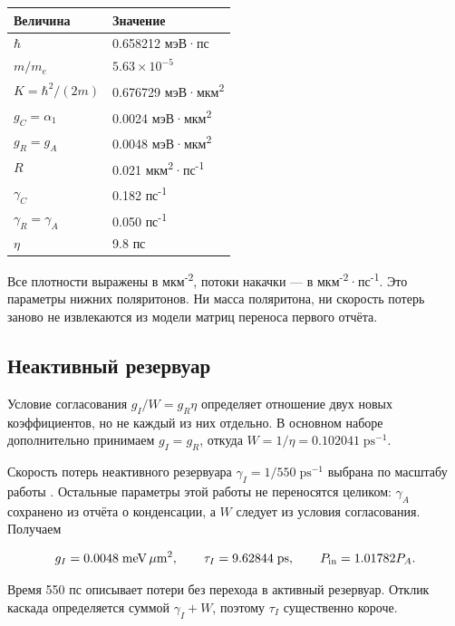 \documentclass[12pt,a4paper]{article}
\begin{document}
\begingroup\small\setlength{\tabcolsep}{5pt}\renewcommand{\arraystretch}{1.2}
\begin{longtable}{@{}p{}p{}@{}}
\toprule
Величина & Значение\\
\midrule
\(\hbar\) & 0.658212 мэВ·пс\\
\(m/m_e\) & \(5.63\times10^{-5}\)\\
\(K=\hbar^2/(2m)\) & 0.676729 мэВ·мкм\textsuperscript{2}\\
\(g_C=\alpha_1\) & 0.0024 мэВ·мкм\textsuperscript{2}\\
\(g_R=g_A\) & 0.0048 мэВ·мкм\textsuperscript{2}\\
\(R\) & 0.021 мкм\textsuperscript{2}·пс\textsuperscript{-}\textsuperscript{1}\\
\(\gamma_C\) & 0.182 пс\textsuperscript{-}\textsuperscript{1}\\
\(\gamma_R=\gamma_A\) & 0.050 пс\textsuperscript{-}\textsuperscript{1}\\
\(\eta\) & 9.8 пс\\
\bottomrule
\end{longtable}
\endgroup

Все плотности выражены в мкм\textsuperscript{-}\textsuperscript{2}, потоки накачки --- в мкм\textsuperscript{-}\textsuperscript{2}·пс\textsuperscript{-}\textsuperscript{1}. Это параметры нижних поляритонов. Ни масса поляритона, ни скорость потерь заново не извлекаются из модели матриц переноса первого отчёта.

\subsection{Неактивный резервуар}

Условие согласования \(g_I/W=g_R\eta\) определяет отношение двух новых коэффициентов, но не каждый из них отдельно. В основном наборе дополнительно принимаем \(g_I=g_R\), откуда \(W=1/\eta=0.102041\;\mathrm{ps}^{-1}\).

Скорость потерь неактивного резервуара \(\gamma_I=1/550\;\mathrm{ps}^{-1}\) выбрана по масштабу работы \cite{ref2}. Остальные параметры этой работы не переносятся целиком: \(\gamma_A\) сохранено из отчёта о конденсации, а \(W\) следует из условия согласования. Получаем

\[
g_I=0.0048\;\mathrm{meV}\,\mu\mathrm m^2,\qquad
\tau_I=9.62844\;\mathrm{ps},\qquad P_{\rm in}=1.01782P_A.
\]

Время 550 пс описывает потери без перехода в активный резервуар. Отклик каскада определяется суммой \(\gamma_I+W\), поэтому \(\tau_I\) существенно короче.
\end{document}
